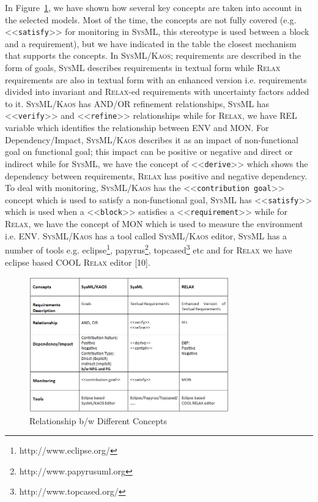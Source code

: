 \documentclass[10pt, conference, compsocconf]{IEEEtran}
\def\myrelax{\textsc{Relax}}                  %
\def\sysml{\textsc{SysML}}
\def\kaos{\textsc{Kaos}}
\newcommand{\Myfig}[1]{Figure~\ref{fig:#1}}
\newcommand{\stereotype}[1]{\textless\textless\texttt{#1}\textgreater\textgreater}
\begin{document}
In \Myfig{Relationship}, we have shown how several key concepts are taken into account in the selected models. Most of the time, the concepts are not fully covered (e.g. \stereotype{satisfy} for monitoring in \sysml{}, this stereotype is used between a block and a requirement), but we have indicated in the table the closest mechanism that supports the concepts. In \sysml{}/\kaos{}; requirements are described in the form of goals, \sysml{} describes requirements in textual form while \myrelax{} requirements are also in textual form with an enhanced version i.e. requirements divided into invariant and \myrelax{}-ed requirements with uncertainty factors added to it. \sysml{}/\kaos{} has AND/OR refinement relationships, \sysml{} has \stereotype{verify} and \stereotype{refine} relationships while for \myrelax{}, we have REL variable which identifies the relationship between ENV and MON. For Dependency/Impact, \sysml{}/\kaos{} describes it as an impact of non-functional goal on functional goal; this impact can be positive or negative and direct or indirect while for \sysml{}, we have the concept of \stereotype{derive} which shows the dependency between requirements, \myrelax{} has positive and negative dependency. To deal with monitoring, \sysml{}/\kaos{} has the \stereotype{contribution goal} concept which is used to satisfy a non-functional goal, \sysml{} has \stereotype{satisfy} which is  used when a \stereotype{block} satisfies a \stereotype{requirement} while for \myrelax{}, we have the concept of MON which is used to measure the environment i.e. ENV. \sysml{}/\kaos{} has a tool called \sysml{}/\kaos{} editor, \sysml{} has a number of tools e.g. eclipse\footnote{http://www.eclipse.org/}, papyrus\footnote{http://www.papyrusuml.org}, topcased\footnote{http://www.topcased.org/} etc and for \myrelax{} we have eclipse based COOL \myrelax{} editor [10]. 

\begin{figure}[!t]
\centering
\includegraphics[width=3.4in]{fig13}
\caption{Relationship b/w Different Concepts}
\label{fig:Relationship}
\end{figure}
\end{document}
